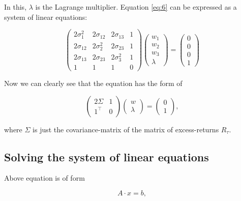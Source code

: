 In this, $\lambda$ is the Lagrange multiplier. Equation \ref{eq:6} can be expressed as a system of linear equations:

\begin{equation} \label{eq:7}
  \begin{pmatrix}
    2\sigma_1^2 & 2\sigma_{12} & 2\sigma_{13} & 1 \\
    2\sigma_{12} & 2\sigma_{2}^2 & 2\sigma_{23} & 1 \\
    2\sigma_{13} & 2\sigma_{23} & 2\sigma_{3}^{2} & 1 \\
    1 & 1 & 1 & 0 
  \end{pmatrix}
  \begin{pmatrix}
    w_1 \\ w_2 \\ w_3 \\ \lambda
  \end{pmatrix}
   =
   \begin{pmatrix}
    0 \\ 0 \\ 0 \\ 1
   \end{pmatrix}
\end{equation}

Now we can clearly see that the equation has the form of

\begin{equation}
  \begin{pmatrix}
    2 \Sigma & 1 \\
    1^\top & 0
  \end{pmatrix}
  \begin{pmatrix}
    w \\ \lambda
  \end{pmatrix}
  =
  \begin{pmatrix}
  0 \\ 1
  \end{pmatrix},
\end{equation}

where $\Sigma$ is just the covariance-matrix of the matrix of excess-returns $R_{\tau}$.


\subsection{Solving the system of linear equations}
Above equation is of form

\begin{equation}
  A \cdot x = b,
\end{equation}

